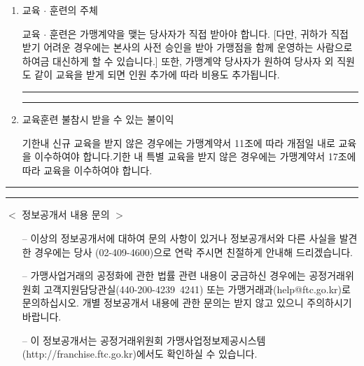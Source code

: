 \documentclass[a5paper,10pt]{oblivoir}
\newcommand\crule[3][black]{\textcolor{#1}{\rule{#2}{#3}}}
\begin{document}
\begin{enumerate}
\begin{tiny}
\begin{Form}
\end{Form}
\end{tiny}

\newpage
\begin{center}
\crule[red]{4cm}{0.1cm} \crule[blue]{4cm}{0.1cm}
\end{center}
\item 교육 $\cdot$ 훈련의 주체

교육 $\cdot$ 훈련은 가맹계약을 맺는 당사자가 직접 받아야 합니다. [다만, 귀하가 직접 받기 어려운 경우에는 본사의 사전 승인을 받아 가맹점을 함께 운영하는 사람으로 하여금 대신하게 할 수 있습니다.] 또한, 가맹계약 당사자가 원하여 당사자 외 직원도 같이 교육을 받게 되면 인원 추가에 따라 비용도 추가됩니다.

\newpage
\begin{center}
\crule[red]{4cm}{0.1cm} \crule[blue]{4cm}{0.1cm}
\end{center}
\item 교육훈련 불참시 받을 수 있는 불이익

기한내 신규 교육을 받지 않은 경우에는 가맹계약서 11조에 따라 개점일 내로 교육을 이수하여야 합니다.기한 내 특별 교육을 받지 않은 경우에는 가맹계약서 17조에 따라 교육을 이수하여야 합니다.

\end{enumerate}

\newpage
\begin{center}
\crule[red]{4cm}{0.1cm} \crule[blue]{4cm}{0.1cm}
\end{center}



\begin{center} $<$  정보공개서 내용 문의 $>$ \end{center}

\begin{enumerate}
\item[--]이상의 정보공개서에 대하여 문의 사항이 있거나 정보공개서와 다른 사실을 발견한 경우에는 당사 (02-409-4600)으로 연락 주시면 친절하게 안내해 드리겠습니다.
\item[--]가맹사업거래의 공정화에 관한 법률 관련 내용이 궁금하신 경우에는 공정거래위원회 고객지원담당관실(440-200-4239~4241) 또는 가맹거래과(help@ftc.go.kr)로문의하십시오. 개별 정보공개서 내용에 관한 문의는 받지 않고 있으니 주의하시기 바랍니다.
\item[--]이 정보공개서는 공정거래위원회 가맹사업정보제공시스템 (http://franchise.ftc.go.kr)에서도 확인하실 수 있습니다.
\end{enumerate}
\end{document}
